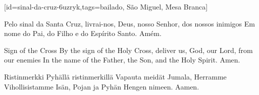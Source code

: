 [id={sinal-da-cruz-6uzryk},tags={bailado, São Miguel, Mesa Branca}]
  \begin{passage}[PT]{}\obeylines
    Pelo sinal da Santa Cruz,
    livrai-nos, Deus, nosso Senhor,
    dos nossos inimigos
    \polpar
    Em nome do Pai, do Filho e do Espírito Santo.
    \polpar
    Amém.
  \end{passage}
  \begin{passage}[EN]{Sign of the Cross}\obeylines
    By the sign of the Holy Cross,
    deliver us, God, our Lord,
    from our enemies
    \polpar
    In the name of the Father, the Son, and the Holy Spirit.
    \polpar
    Amen.
  \end{passage}
  \begin{passage}[FI]{Ristinmerkki}\obeylines
    Pyhällä ristinmerkillä
    Vapauta meidät Jumala, Herramme
    Vihollisistamme
    \polpar
    Isän, Pojan ja Pyhän Hengen nimeen.
    \polpar
    Aamen.
  \end{passage}
  \vspace*{\fill}
\endsong
